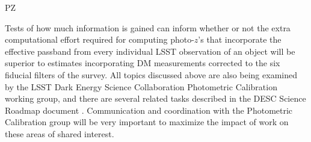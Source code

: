 {\begin{tasklist}{PZ}
\begin{task}
{Tests of how much information is gained can inform whether or not the extra computational effort required for computing photo-$z$'s that incorporate the effective passband from every individual LSST observation of an object will be superior to estimates incorporating DM measurements corrected to the six fiducial filters of the survey.  All topics discussed above are also being examined by the LSST Dark Energy Science Collaboration Photometric Calibration working group, and there are several related tasks described in the DESC Science Roadmap document \citep{LSSTDESC}.
Communication and coordination with the Photometric Calibration group will be very important to maximize the impact of work on these areas of shared interest.
}
~\\
~\\
\end{task}


\end{tasklist}}
